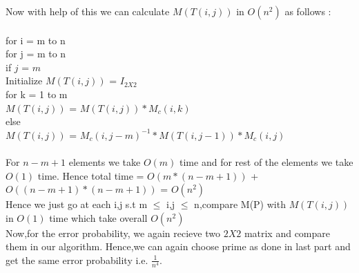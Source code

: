 \documentclass{article}
\begin{document}
\pagebreak 
Now with help of this we can calculate $M(T(i,j))$ in $O(n^{2})$ as follows : \\\\
for i = m to n \\
\hspace*{1cm}	for j = m to n \\ 
\hspace*{2cm}if $j$ = $m$ \\
\hspace*{3cm}	Initialize $M(T(i,j))$ = $I_{2X2}$ \\ 
\hspace*{3cm}	for k = 1 to m  \\ 
\hspace*{4cm}		$M(T(i,j))$ = $M(T(i,j)) * M_c(i,k)$ \\
\hspace*{2cm}else \\
\hspace*{3cm} $M(T(i,j))$ = $M_c(i,j-m)^{-1}*M(T(i,j-1))*M_c(i,j)$\\\\
For $n-m+1$ elements we take $O(m)$ time and for rest of the elements we take $O(1)$ time. Hence total time = $O(m*(n-m+1))$ + $O((n-m+1)*(n-m+1))$ = $O(n^{2})$\\ 
Hence we just go at each i,j s.t m $\leq$ i,j $\leq$ n,compare M(P) with $M(T(i,j))$ in $O(1)$ time which take overall $O(n^2)$ \\
Now,for the error probability, we again recieve two $2X2$ matrix and compare them in our algorithm. Hence,we can again choose prime as done in last part and get the same error probability i.e. $\frac{1}{n^4}$. \\
\end{document}
